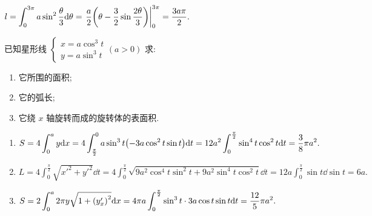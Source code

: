 \begin{solution}
    $l=\displaystyle\int_{0}^{3\pi}a\sin^2\dfrac{\theta}{3}\dd \theta=\eval{\dfrac{a}{2}\qty(\theta-\dfrac{3}{2}\sin\dfrac{2\theta}{3})}_{0}^{3\pi}=\dfrac{3a\pi}{2}.$
\end{solution}

\begin{example}
    已知星形线 $\begin{cases}
            x=a\cos^3t \\ y=a\sin^3t
        \end{cases}(a>0)$ 求:
    \begin{enumerate}[label=(\arabic{*})]
        \item 它所围的面积;
        \item 它的弧长;
        \item 它绕 $x$ 轴旋转而成的旋转体的表面积.
    \end{enumerate}
\end{example}
\begin{solution}
    \begin{enumerate}[label=(\arabic{*})]
        \item $\displaystyle S=4\int_{0}^{a} y \dd x=4\int_{\frac{\pi}{2}}^{0} a\sin^3t\qty(-3a\cos^2t\sin t) \dd t=12a^2\int_{0}^{\frac{\pi}{2}} \sin^4t\cos^2t \dd t=\dfrac{3}{8}\pi a^2.$
        \item $\displaystyle L=4\int_{0}^{\frac{\pi}{2}} \sqrt{x'^2+y'^2} \dd t=4\int_{0}^{\frac{\pi}{2}} \sqrt{9a^2\cos^4t\sin^2t+9a^2\sin^4t\cos^2t} \dd t=12a\int_{0}^{\frac{\pi}{2}} \sin t \dd \sin t=6a.$
        \item $\displaystyle S=2\int_{0}^{a} 2\pi y\sqrt{1+\qty(y'_x)^2} \dd x=4\pi a\int_{0}^{\frac{\pi}{2}} \sin^3t\cdot 3a \cos t\sin t \dd t=\dfrac{12}{5}\pi a^2.$
    \end{enumerate}
\end{solution}

